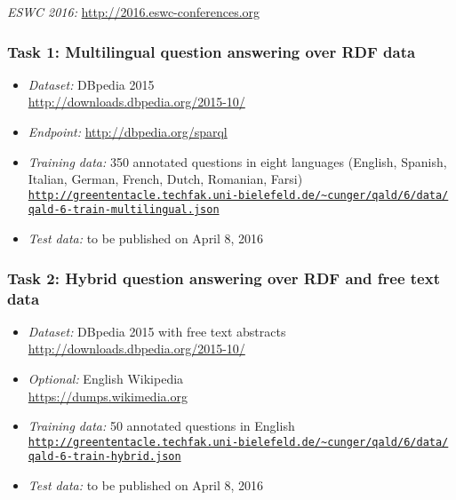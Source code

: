\documentclass[a4paper]{article}
\begin{document}
{{\em ESWC 2016:} \url{http://2016.eswc-conferences.org}




\subsubsection*{Task 1: Multilingual question answering over RDF data}
\begin{itemize}
\item \emph{Dataset:} DBpedia 2015\\ \url{http://downloads.dbpedia.org/2015-10/}
\item \emph{Endpoint:} \url{http://dbpedia.org/sparql}
\item \emph{Training data:} 350 annotated questions in eight languages (English, Spanish, Italian, German, French, Dutch, Romanian, Farsi) \\
\href{http://greententacle.techfak.uni-bielefeld.de/~cunger/qald/6/data/qald-6-train-multilingual.json}{\texttt{http://greententacle.techfak.uni-bielefeld.de/\textasciitilde cunger/qald/6/data/\\qald-6-train-multilingual.json}}
\item \emph{Test data:} to be published on April 8, 2016
\end{itemize}

\subsubsection*{Task 2: Hybrid question answering over RDF and free text data}
\begin{itemize}
\item \emph{Dataset:} DBpedia 2015 with free text abstracts\\ \url{http://downloads.dbpedia.org/2015-10/}
\item[] \emph{Optional:} English Wikipedia\\ \url{https://dumps.wikimedia.org}
\item \emph{Training data:} 50 annotated questions in English \\
\href{http://greententacle.techfak.uni-bielefeld.de/~cunger/qald/6/data/qald-6-train-hybrid.json}{\texttt{http://greententacle.techfak.uni-bielefeld.de/\textasciitilde cunger/qald/6/data/\\qald-6-train-hybrid.json}}
\item \emph{Test data:} to be published on April 8, 2016
\end{itemize}

}
\end{document}
